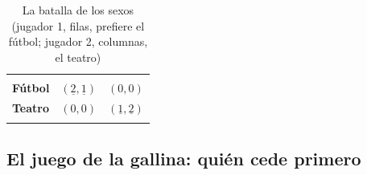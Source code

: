 \documentclass[11pt]{article}
\begin{document}
\begin{table}[H]
\centering
\caption{La batalla de los sexos (jugador 1, filas, prefiere el fútbol; jugador 2, columnas, el teatro)}\label{tab:batalla-sexos}
\begin{tabular}{>{\centering\arraybackslash}m{2.4cm}|>{\centering\arraybackslash}m{2.6cm}|>{\centering\arraybackslash}m{2.6cm}|}
\multicolumn{1}{c}{} & \multicolumn{1}{c}{\textbf{Fútbol}} & \multicolumn{1}{c}{\textbf{Teatro}}\\
\hhline{~|-|-|}
\textbf{Fútbol} & \cellcolor{tceesalvia}$(\underline{2},\underline{1})$ & $(0,0)$\\
\hhline{~|-|-|}
\textbf{Teatro} & $(0,0)$ & \cellcolor{tceesalvia}$(\underline{1},\underline{2})$\\
\hhline{~|-|-|}
\end{tabular}
\end{table}

\subsection*{El juego de la gallina: quién cede primero}
\end{document}
